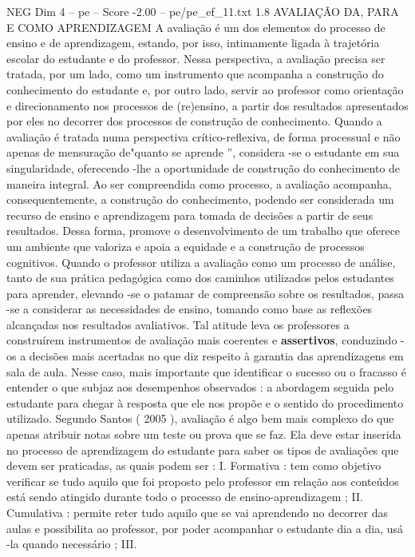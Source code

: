 \begin{textsample}{NEG Dim 4 – pe – Score -2.00 – pe/pe\_ef\_11.txt}  \label{ex:f4_neg_011}
1.8 AVALIAÇÃO DA, PARA E COMO APRENDIZAGEM A avaliação é um dos elementos do processo de ensino e de aprendizagem, estando, por isso, intimamente ligada à trajetória escolar do estudante e do professor.
Nessa perspectiva, a avaliação precisa ser tratada, por um lado, como um instrumento que acompanha a construção do conhecimento do estudante e, por outro lado, servir ao professor como orientação e direcionamento nos processos de (re)ensino, a partir dos resultados apresentados por eles no decorrer dos processos de construção de conhecimento.
Quando a avaliação é tratada numa perspectiva crítico-reflexiva, de forma processual e não apenas de mensuração de"quanto se aprende ”, considera -se o estudante em sua singularidade, oferecendo -lhe a oportunidade de construção do conhecimento de maneira integral.
Ao ser compreendida como processo, a avaliação acompanha, consequentemente, a construção do conhecimento, podendo ser considerada um recurso de ensino e aprendizagem para tomada de decisões a partir de seus resultados.
Dessa forma, promove o desenvolvimento de um trabalho que oferece um ambiente que valoriza e apoia a equidade e a construção de processos cognitivos.
Quando o professor utiliza a avaliação como um processo de análise, tanto de sua prática pedagógica como dos caminhos utilizados pelos estudantes para aprender, elevando -se o patamar de compreensão sobre os resultados, passa -se a considerar as necessidades de ensino, tomando como base as reflexões alcançadas nos resultados avaliativos.
Tal atitude leva os professores a construírem instrumentos de avaliação mais coerentes e \textbf{assertivos}, conduzindo -os a decisões mais acertadas no que diz respeito à garantia das aprendizagens em sala de aula.
Nesse caso, mais importante que identificar o sucesso ou o fracasso é entender o que subjaz aos desempenhos observados : a abordagem seguida pelo estudante para chegar à resposta que ele nos propõe e o sentido do procedimento utilizado.
Segundo Santos ( 2005 ), avaliação é algo bem mais complexo do que apenas atribuir notas sobre um teste ou prova que se faz.
Ela deve estar inserida no processo de aprendizagem do estudante para saber os tipos de avaliações que devem ser praticadas, as quais podem ser : I.
Formativa : tem como objetivo verificar se tudo aquilo que foi proposto pelo professor em relação aos conteúdos está sendo atingido durante todo o processo de ensino-aprendizagem ; II.
Cumulativa : permite reter tudo aquilo que se vai aprendendo no decorrer das aulas e possibilita ao professor, por poder acompanhar o estudante dia a dia, usá -la quando necessário ; III.

\end{textsample}
